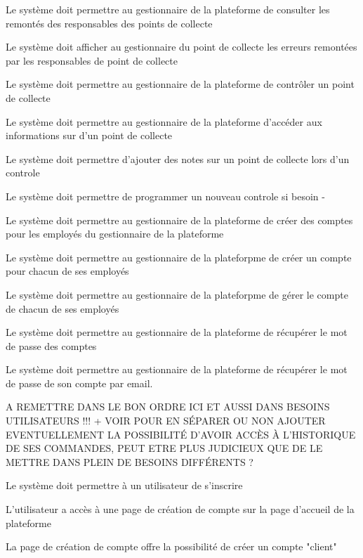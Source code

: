 \begin{reqf}{Le système doit permettre au gestionnaire de la plateforme de consulter les remontés des responsables des points de collecte}
\item Le système doit afficher au gestionnaire du point de collecte les erreurs remontées par les responsables de point de collecte
\end{reqf}

\begin{reqf}{Le système doit permettre au gestionnaire de la plateforme de contrôler un point de collecte}
\item Le système doit permettre au gestionnaire de la plateforme d'accéder aux informations sur d'un point de collecte
\item Le système doit permettre d'ajouter des notes sur un point de collecte lors d'un controle
\item Le système doit permettre de programmer un nouveau controle si besoin -
\end{reqf}

\begin{reqf}{Le système doit permettre au gestionnaire de la plateforme de créer des comptes pour les employés du gestionnaire de la plateforme}
\item Le système doit permettre au gestionnaire de la plateforpme de créer un compte pour chacun de ses employés
\item Le système doit permettre au gestionnaire de la plateforpme de gérer le compte de chacun de ses employés
\end{reqf}

\begin{reqf}{Le système doit permettre au gestionnaire de la plateforme de récupérer le mot de passe des comptes}
\item Le système doit permettre au gestionnaire de la plateforme de récupérer le mot de passe de son compte par email.
\end{reqf}






A REMETTRE DANS LE BON ORDRE ICI ET AUSSI DANS BESOINS UTILISATEURS !!!
+ VOIR POUR EN SÉPARER OU NON
AJOUTER EVENTUELLEMENT LA POSSIBILITÉ D'AVOIR ACCÈS À L'HISTORIQUE DE SES COMMANDES, PEUT ETRE PLUS JUDICIEUX QUE DE LE METTRE DANS PLEIN DE BESOINS DIFFÉRENTS ?

\begin{reqf}{Le système doit permettre à un utilisateur de s'inscrire}
\item L'utilisateur a accès à une page de création de compte sur la page d'accueil de la plateforme
\item La page de création de compte offre la possibilité de créer un compte "client"
\end{reqf}

